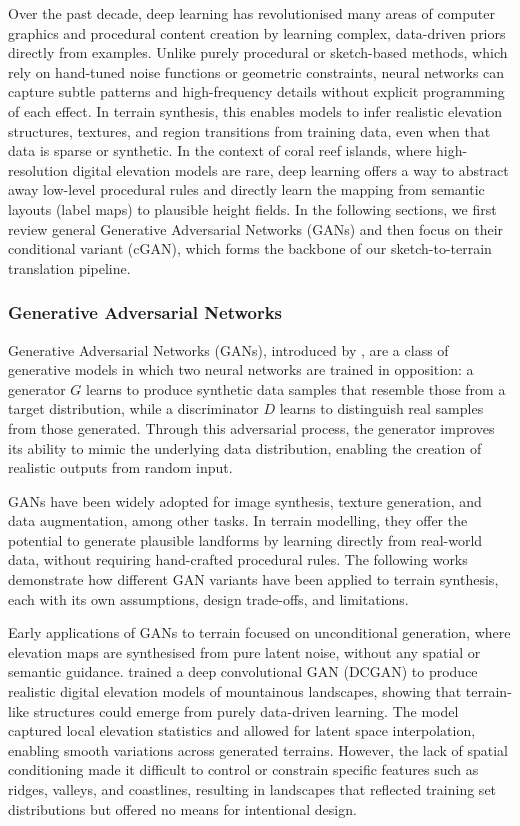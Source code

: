 Over the past decade, deep learning has revolutionised many areas of computer graphics and procedural content creation by learning complex, data-driven priors directly from examples. Unlike purely procedural or sketch-based methods, which rely on hand-tuned noise functions or geometric constraints, neural networks can capture subtle patterns and high-frequency details without explicit programming of each effect. In terrain synthesis, this enables models to infer realistic elevation structures, textures, and region transitions from training data, even when that data is sparse or synthetic. In the context of coral reef islands, where high-resolution digital elevation models are rare, deep learning offers a way to abstract away low-level procedural rules and directly learn the mapping from semantic layouts (label maps) to plausible height fields. In the following sections, we first review general Generative Adversarial Networks (GANs) and then focus on their conditional variant (cGAN), which forms the backbone of our sketch-to-terrain translation pipeline.

\subsubsection{Generative Adversarial Networks}
\label{sec:coral-island-sota-GAN}

Generative Adversarial Networks (GANs), introduced by \cite{Goodfellow2014}, are a class of generative models in which two neural networks are trained in opposition: a generator $G$ learns to produce synthetic data samples that resemble those from a target distribution, while a discriminator $D$ learns to distinguish real samples from those generated. Through this adversarial process, the generator improves its ability to mimic the underlying data distribution, enabling the creation of realistic outputs from random input.

GANs have been widely adopted for image synthesis, texture generation, and data augmentation, among other tasks. In terrain modelling, they offer the potential to generate plausible landforms by learning directly from real-world data, without requiring hand-crafted procedural rules. The following works demonstrate how different GAN variants have been applied to terrain synthesis, each with its own assumptions, design trade-offs, and limitations.

Early applications of GANs to terrain focused on unconditional generation, where elevation maps are synthesised from pure latent noise, without any spatial or semantic guidance. \citep{WulffJensen2018} trained a deep convolutional GAN (DCGAN) to produce realistic digital elevation models of mountainous landscapes, showing that terrain-like structures could emerge from purely data-driven learning. The model captured local elevation statistics and allowed for latent space interpolation, enabling smooth variations across generated terrains. However, the lack of spatial conditioning made it difficult to control or constrain specific features such as ridges, valleys, and coastlines, resulting in landscapes that reflected training set distributions but offered no means for intentional design.

